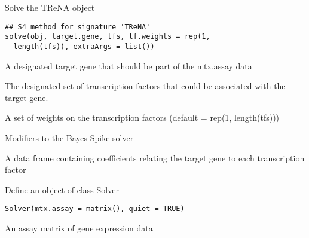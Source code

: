 \documentclass[a4paper]{book}
\begin{document}
%
\begin{SeeAlso}\relax
{}
\end{SeeAlso}
%
\begin{Description}\relax
Solve the TReNA object
\end{Description}
%
\begin{Usage}
\begin{verbatim}
## S4 method for signature 'TReNA'
solve(obj, target.gene, tfs, tf.weights = rep(1,
  length(tfs)), extraArgs = list())
\end{verbatim}
\end{Usage}
%
\begin{Arguments}
\begin{ldescription}
\item[\code{target.gene}] A designated target gene that should be part of the mtx.assay data

\item[\code{tfs}] The designated set of transcription factors that could be associated with the target gene.

\item[\code{tf.weights}] A set of weights on the transcription factors (default = rep(1, length(tfs)))

\item[\code{extraArgs}] Modifiers to the Bayes Spike solver
\end{ldescription}
\end{Arguments}
%
\begin{Value}
A data frame containing coefficients relating the target gene to each transcription factor
\end{Value}
%
\begin{Description}\relax
Define an object of class Solver
\end{Description}
%
\begin{Usage}
\begin{verbatim}
Solver(mtx.assay = matrix(), quiet = TRUE)
\end{verbatim}
\end{Usage}
%
\begin{Arguments}
\begin{ldescription}
\item[\code{mtx.assay}] An assay matrix of gene expression data
\end{ldescription}
\end{Arguments}
\end{document}
